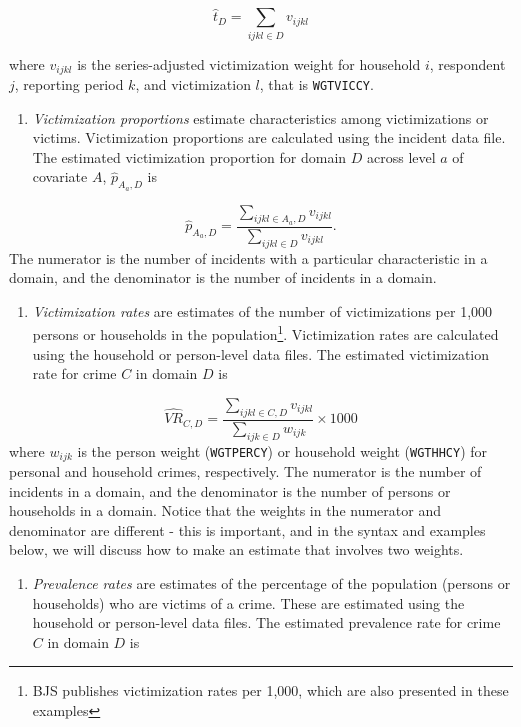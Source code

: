 \documentclass[
]{krantz}
\providecommand{\tightlist}{%
  \setlength{\itemsep}{0pt}\setlength{\parskip}{0pt}}
\begin{document}
\[ \hat{t}_D = \sum_{ijkl \in D} v_{ijkl}\]

where \(v_{ijkl}\) is the series-adjusted victimization weight for household \(i\), respondent \(j\), reporting period \(k\), and victimization \(l\), that is \texttt{WGTVICCY}.

\begin{enumerate}
\def\labelenumi{\arabic{enumi}.}
\setcounter{enumi}{1}
\tightlist
\item
  \emph{Victimization proportions} estimate characteristics among victimizations or victims. Victimization proportions are calculated using the incident data file. The estimated victimization proportion for domain \(D\) across level \(a\) of covariate \(A\), \(\hat{p}_{A_a,D}\) is
\end{enumerate}

\[ \hat{p}_{A_a,D} =\frac{\sum_{ijkl \in A_a, D} v_{ijkl}}{\sum_{ijkl \in D} v_{ijkl}}.\]
The numerator is the number of incidents with a particular characteristic in a domain, and the denominator is the number of incidents in a domain.

\begin{enumerate}
\def\labelenumi{\arabic{enumi}.}
\setcounter{enumi}{2}
\tightlist
\item
  \emph{Victimization rates} are estimates of the number of victimizations per 1,000 persons or households in the population\footnote{BJS publishes victimization rates per 1,000, which are also presented in these examples}. Victimization rates are calculated using the household or person-level data files. The estimated victimization rate for crime \(C\) in domain \(D\) is
\end{enumerate}

\[\hat{VR}_{C,D}= \frac{\sum_{ijkl \in C,D} v_{ijkl}}{\sum_{ijk \in D} w_{ijk}}\times 1000\]
where \(w_{ijk}\) is the person weight (\texttt{WGTPERCY}) or household weight (\texttt{WGTHHCY}) for personal and household crimes, respectively. The numerator is the number of incidents in a domain, and the denominator is the number of persons or households in a domain. Notice that the weights in the numerator and denominator are different - this is important, and in the syntax and examples below, we will discuss how to make an estimate that involves two weights.

\begin{enumerate}
\def\labelenumi{\arabic{enumi}.}
\setcounter{enumi}{3}
\tightlist
\item
  \emph{Prevalence rates} are estimates of the percentage of the population (persons or households) who are victims of a crime. These are estimated using the household or person-level data files. The estimated prevalence rate for crime \(C\) in domain \(D\) is
\end{enumerate}
\end{document}
